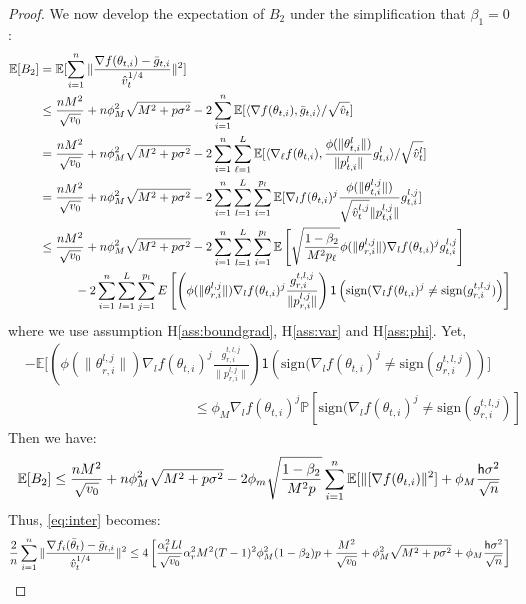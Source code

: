 \documentclass[11pt]{article}
\def\E{\mathbb{E}}
\def\tot{\mathsf{h}}
\newcommand{\sign}{\text{sign}}
\begin{document}
\begin{proof}
We now develop the expectation of $B_2$ under the simplification that $\beta_1 = 0$:
\begin{align}\notag
    \mathbb E[B_2]&=\mathbb E[\sum_{i=1}^n\Vert \frac{\nabla f(\theta_{t,i})-\bar g_{t,i}}{\hat v_t^{1/4}} \Vert^2] \\\notag
    &\leq \frac{nM^2}{\sqrt{v_0}}+n\phi_M^2\sqrt{M^2+p\sigma^2}-2\sum_{i=1}^n\mathbb E[\langle \nabla f(\theta_{t,i}),\bar g_{t,i} \rangle/\sqrt{\hat v_t}]\\\notag
    &=\frac{nM^2}{\sqrt{v_0}}+n\phi_M^2\sqrt{M^2+p\sigma^2}-2\sum_{i=1}^n \sum_{\ell=1}^L \mathbb E[\langle \nabla_\ell f(\theta_{t,i}),\frac{\phi(\|\theta_{t,i}^l \|)}{\| p_{t,i}^l \|}g_{t,i}^l \rangle/\sqrt{\hat v_t^l}]\\\notag
    &=\frac{nM^2}{\sqrt{v_0}}+n\phi_M^2\sqrt{M^2+p\sigma^2}-2\sum_{i=1}^n \sum_{l=1}^L\sum_{i=1}^{p_l} \mathbb E[\nabla_l f(\theta_{t,i})^j\frac{\phi(\|\theta_{t,i}^{l,j} \|)}{\sqrt{\hat v_t^{l,j}}\| p_{t,i}^{l,j} \|}g_{t,i}^{l,j} ]\\\notag
    & \leq \frac{nM^2}{\sqrt{v_0}}+n\phi_M^2\sqrt{M^2+p\sigma^2}-2\sum_{i=1}^n \sum_{l=1}^L\sum_{i=1}^{p_l} \mathbb E \left[ \sqrt{\frac{1-\beta_2}{M^2 p_\ell}}  \phi(\|\theta_{r,i}^{l,j}\|)  \nabla_l f(\theta_{t,i})^j  g_{t,i}^{l,j}\right]\\\notag
    &\hspace{0.4in} -2 \sum_{i = 1}^n \sum_{l=1}^L\sum_{j=1}^{p_l}  E \left[  \left( \phi(\|\theta_{r,i}^{l,j}\|)   \nabla_l f(\theta_{t,i})^j   \frac{g_{r,i}^{t,l,j}}{ \|p_{r,i}^{l,j}\|}\right)\mathsf{1}\left( \sign(  \nabla_l f(\theta_{t,i})^j \neq  \sign( g_{r,i}^{t,l,j}) \right)\right]
\end{align}
where we use assumption H\ref{ass:boundgrad}, H\ref{ass:var} and H\ref{ass:phi}. 
Yet,
\begin{align*}
&- \mathbb E \Bigg[  \left( \phi(\|\theta_{r,i}^{l,j}\|)   \nabla_l f(\theta_{t,i})^j   \frac{g_{r,i}^{t,l,j}}{ \|p_{r,i}^{l,j}\|}\right)\mathsf{1}\left( \sign(  \nabla_l f(\theta_{t,i})^j
\neq  \sign( g_{r,i}^{t,l,j}) \right)\Bigg] \\
&\hspace{2in} \leq  \phi_M \nabla_l f(\theta_{t,i})^j   \mathbb{P}\left[  \sign(  \nabla_l f(\theta_{t,i})^j \neq  \sign( g_{r,i}^{t,l,j}) \right]
\end{align*}
Then we have:
\begin{align}\notag
    \mathbb E[B_2]\leq  \frac{nM^2}{\sqrt{v_0}}+n\phi_M^2\sqrt{M^2+p\sigma^2}-2 \phi_m \sqrt{\frac{1-\beta_2}{M^2 p}} \sum_{i=1}^n \E[\| [\nabla f(\theta_{t,i}) \|^2] + \phi_M \frac{\tot \sigma^2}{\sqrt{n}}
\end{align}
Thus, \eqref{eq:inter} becomes:
\begin{align}\notag
    \frac{2}{n}\sum_{i=1}^n\Vert \frac{\nabla f_i(\bar\theta_t)-\bar g_{t,i}}{\hat v_t^{1/4}} \Vert^2 \leq 4 \left[ \frac{\alpha_t^2 Ll}{\sqrt{v_0}} \alpha_r^2 M^2 (T-1)^2 \phi_M^2 (1-\beta_2)p + \frac{M^2}{\sqrt{v_0}}+\phi_M^2\sqrt{M^2+p\sigma^2} + \phi_M \frac{\tot \sigma^2}{\sqrt{n}}\right]
\end{align}


\end{proof}
\end{document}
